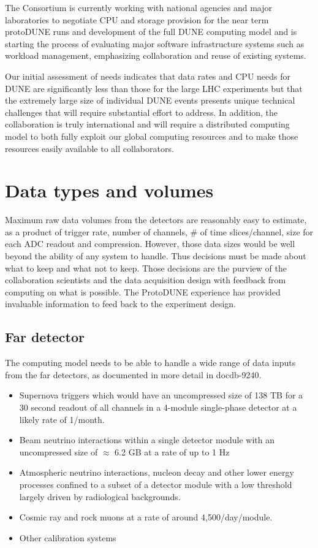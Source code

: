 The Consortium is currently working with national agencies and major laboratories to negotiate CPU and storage provision for the near term protoDUNE runs and development of the full DUNE computing model and is starting the process of evaluating major software infrastructure systems such as workload management, emphasizing collaboration and reuse of existing systems. 

Our initial assessment of needs indicates that data rates and CPU needs for DUNE are significantly less than those for the large LHC experiments but that the extremely large size of individual DUNE events presents unique technical challenges that will require substantial effort to address.  In addition, the collaboration is truly international and will require a distributed computing model to both fully exploit our global computing resources and to make those resources easily available to all collaborators. 


\section{Data types and volumes}
Maximum raw data volumes from the detectors are reasonably easy to estimate, as a product of trigger rate, number of channels, \# of time slices/channel,  size for each ADC readout and compression. However, those data sizes would be well beyond the ability of any system to handle. Thus decisions must be made about what to keep and what not to keep. Those decisions are the purview of the collaboration scientists and the data acquisition design with feedback from computing on what is possible.  The ProtoDUNE experience has provided invaluable information to feed back to the experiment design. 




\subsection{Far detector}

The computing model needs to be able to handle a wide range of data inputs from the far detectors, as documented in more detail in docdb-9240.

\begin{itemize}
\item Supernova triggers which would have an uncompressed size of 138 TB for a 30 second readout of all channels in a 4-module single-phase detector at a likely rate of 1/month.  
\item Beam neutrino interactions within a single detector module with an uncompressed size of $\approx$ 6.2 GB at a rate of up to 1 Hz
\item Atmospheric neutrino interactions, nucleon decay and other lower energy processes confined to a subset of a detector module with a low threshold largely driven by radiological backgrounds.
\item Cosmic ray and rock muons at a rate of around 4,500/day/module.
\item Other calibration systems 
\end{itemize}

